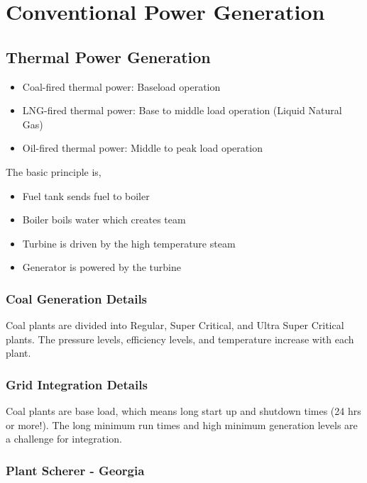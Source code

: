 \documentclass[12pt, a4paper]{report}
\begin{document}
  \chapter{Conventional Power Generation}

  \section{Thermal Power Generation}

  \begin{itemize}
    \item Coal-fired thermal power: Baseload operation
    \item LNG-fired thermal power: Base to middle load operation (Liquid Natural Gas)
    \item Oil-fired thermal power: Middle to peak load operation
  \end{itemize}

  The basic principle is,

  \begin{itemize}
    \item Fuel tank sends fuel to boiler
    \item Boiler boils water which creates team
    \item Turbine is driven by the high temperature steam
    \item Generator is powered by the turbine
  \end{itemize}

  \subsection{Coal Generation Details}

  Coal plants are divided into Regular, Super Critical, and Ultra Super Critical plants. The pressure levels, efficiency levels, and temperature increase with each plant.

  \subsection{Grid Integration Details}

  Coal plants are base load, which means long start up and shutdown times (24 hrs or more!). The long minimum run times and high minimum generation levels are a challenge for integration.

  \subsection{Plant Scherer - Georgia}
\end{document}
